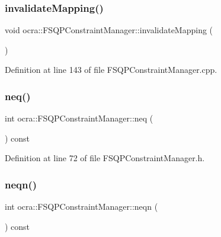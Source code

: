 \hypertarget{classocra_1_1FSQPConstraintManager_a54f055c7be78852480dbd3f5ba66656e}{}\label{classocra_1_1FSQPConstraintManager_a54f055c7be78852480dbd3f5ba66656e} 
\subsubsection{\texorpdfstring{invalidate\+Mapping()}{invalidateMapping()}}
{\footnotesize\ttfamily void ocra\+::\+F\+S\+Q\+P\+Constraint\+Manager\+::invalidate\+Mapping (\begin{DoxyParamCaption}{ }\end{DoxyParamCaption})}



Definition at line 143 of file F\+S\+Q\+P\+Constraint\+Manager.\+cpp.

\hypertarget{classocra_1_1FSQPConstraintManager_a409c77e57544db480b0420acdfc7a1d6}{}\label{classocra_1_1FSQPConstraintManager_a409c77e57544db480b0420acdfc7a1d6} 
\subsubsection{\texorpdfstring{neq()}{neq()}}
{\footnotesize\ttfamily int ocra\+::\+F\+S\+Q\+P\+Constraint\+Manager\+::neq (\begin{DoxyParamCaption}{ }\end{DoxyParamCaption}) const\hspace{0.3cm}{\ttfamily [inline]}}



Definition at line 72 of file F\+S\+Q\+P\+Constraint\+Manager.\+h.

\hypertarget{classocra_1_1FSQPConstraintManager_a926e1a8a27fe1fcfe17cc0c79617f736}{}\label{classocra_1_1FSQPConstraintManager_a926e1a8a27fe1fcfe17cc0c79617f736} 
\subsubsection{\texorpdfstring{neqn()}{neqn()}}
{\footnotesize\ttfamily int ocra\+::\+F\+S\+Q\+P\+Constraint\+Manager\+::neqn (\begin{DoxyParamCaption}{ }\end{DoxyParamCaption}) const\hspace{0.3cm}{\ttfamily [inline]}}



